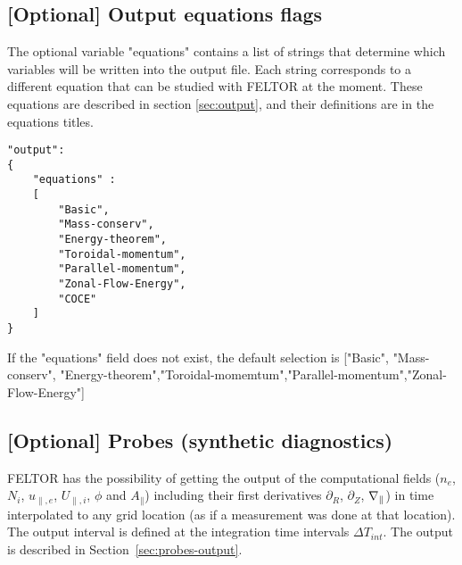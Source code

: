 \subsection{[Optional] Output equations flags}\label{sec:output_flags}
The optional variable "equations" contains a list of strings that
determine which variables will be written into the output file.
Each string
corresponds to a different equation that can be studied with FELTOR at the
moment. These equations are described in section \ref{sec:output}, and their
definitions are in the equations titles.
\begin{verbatim}
"output":
{
    "equations" :
    [
        "Basic",
        "Mass-conserv",
        "Energy-theorem",
        "Toroidal-momentum",
        "Parallel-momentum",
        "Zonal-Flow-Energy",
        "COCE"
    ]
}
\end{verbatim}
\begin{tcolorbox}[title=Note]
    If the "equations" field does not exist, the default selection is ["Basic", "Mass-conserv", "Energy-theorem","Toroidal-momemtum","Parallel-momentum","Zonal-Flow-Energy"]
\end{tcolorbox}

\subsection{[Optional] Probes (synthetic diagnostics)}
FELTOR has the possibility of getting the output of the computational fields
($n_e$, $N_i$, $u_{\parallel,e}$, $U_{\parallel,i}$, $\phi$ and $A_\parallel$)
including their first derivatives $\partial_R$, $\partial_Z$, $\nabla_\parallel$) in time
interpolated to any grid location (as if a measurement was done at that
location). The output interval is defined at the integration time intervals
$\Delta T_{int}$. The output is described in Section~\ref{sec:probes-output}.

